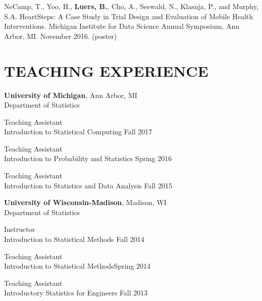 \documentclass[letterpaper, 11pt]{article}
\begin{document}
NeCamp, T., Yoo, H., \textbf{Luers, B.}, Cho, A., Seewald, N., Klasnja, P., and Murphy, S.A. HeartSteps: A Case Study in Trial Design and Evaluation of Mobile Health Interventions. Michigan Institute for Data Science Annual Symposium, Ann Arbor, MI. November 2016. (poster)


\section{TEACHING EXPERIENCE}
{\bf University of Michigan}, Ann Arbor, MI \\
Department of Statistics

\hspace{15pt}Teaching Assistant\\
\hspace{15pt}%
Introduction to Statistical Computing \hfill Fall 2017

\hspace{15pt}Teaching Assistant\\
\hspace{15pt}%
Introduction to Probability and Statistics \hfill Spring 2016

\hspace{15pt}Teaching Assistant\\
\hspace{15pt}%
Introduction to Statistics and Data Analysis \hfill Fall 2015

\vspace{6pt}
{\bf University of Wisconsin-Madison}, Madison, WI\\
Department of Statistics

\hspace{15pt}Instructor\\
\hspace{15pt}%
Introduction to Statistical Methods \hfill Fall 2014

\hspace{15pt}Teaching Assistant\\
\hspace{15pt}%
Introduction to Statistical Methods\hfill Spring 2014

\hspace{15pt}Teaching Assistant\\
\hspace{15pt}%
Introductory Statistics for Engineers \hfill Fall 2013
\end{document}

